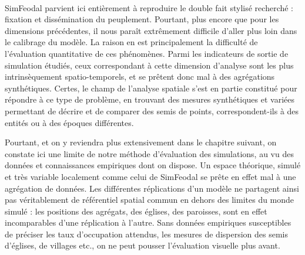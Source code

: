 \bigskip

\paragraph[Conclusion intermédiaire]{}
SimFeodal parvient ici entièrement à reproduire le double fait stylisé recherché : fixation et dissémination du peuplement.
Pourtant, plus encore que pour les dimensions précédentes, il nous paraît extrêmement difficile d'aller plus loin dans le calibrage du modèle.
La raison en est principalement la difficulté de l'évaluation quantitative de ces phénomènes.
Parmi les indicateurs de sortie de simulation étudiés, ceux correspondant à cette dimension d'analyse sont les plus intrinsèquement spatio-temporels, et se prêtent donc mal à des agrégations synthétiques.
Certes, le champ de l'analyse spatiale s'est en partie constitué pour répondre à ce type de problème, en trouvant des mesures synthétiques et variées permettant de décrire et de comparer des semis de points, correspondent-ils à des entités ou à des époques différentes.

Pourtant, et on y reviendra plus extensivement dans le chapitre suivant, on constate ici une limite de notre méthode d'évaluation des simulations, au vu des données et connaissances empiriques dont on dispose.
Un espace théorique, simulé et très variable localement comme celui de SimFeodal se prête en effet mal à une agrégation de données.
Les différentes réplications d'un modèle ne partagent ainsi pas véritablement de référentiel spatial commun en dehors des limites du monde simulé : les positions des agrégats, des églises, des paroisses, sont en effet incomparables d'une réplication à l'autre.
Sans données empiriques susceptibles de préciser les taux d'occupation attendus, les mesures de dispersion des semis d'églises, de villages etc., on ne peut pousser l'évaluation visuelle plus avant.


